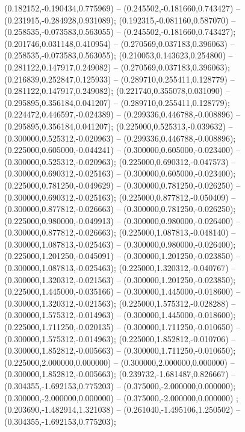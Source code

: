  (0.182152,-0.190434,0.775969) -- (0.245502,-0.181660,0.743427) -- (0.231915,-0.284928,0.931089);
 (0.192315,-0.081160,0.587070) -- (0.258535,-0.073583,0.563055) -- (0.245502,-0.181660,0.743427);
 (0.201746,0.031148,0.410954) -- (0.270569,0.037183,0.396063) -- (0.258535,-0.073583,0.563055);
 (0.210053,0.143623,0.254800) -- (0.281122,0.147917,0.249082) -- (0.270569,0.037183,0.396063);
 (0.216839,0.252847,0.125933) -- (0.289710,0.255411,0.128779) -- (0.281122,0.147917,0.249082);
 (0.221740,0.355078,0.031090) -- (0.295895,0.356184,0.041207) -- (0.289710,0.255411,0.128779);
 (0.224472,0.446597,-0.024389) -- (0.299336,0.446788,-0.008896) -- (0.295895,0.356184,0.041207);
 (0.225000,0.525313,-0.039632) -- (0.300000,0.525312,-0.020963) -- (0.299336,0.446788,-0.008896);
 (0.225000,0.605000,-0.044241) -- (0.300000,0.605000,-0.023400) -- (0.300000,0.525312,-0.020963);
 (0.225000,0.690312,-0.047573) -- (0.300000,0.690312,-0.025163) -- (0.300000,0.605000,-0.023400);
 (0.225000,0.781250,-0.049629) -- (0.300000,0.781250,-0.026250) -- (0.300000,0.690312,-0.025163);
 (0.225000,0.877812,-0.050409) -- (0.300000,0.877812,-0.026663) -- (0.300000,0.781250,-0.026250);
 (0.225000,0.980000,-0.049913) -- (0.300000,0.980000,-0.026400) -- (0.300000,0.877812,-0.026663);
 (0.225000,1.087813,-0.048140) -- (0.300000,1.087813,-0.025463) -- (0.300000,0.980000,-0.026400);
 (0.225000,1.201250,-0.045091) -- (0.300000,1.201250,-0.023850) -- (0.300000,1.087813,-0.025463);
 (0.225000,1.320312,-0.040767) -- (0.300000,1.320312,-0.021563) -- (0.300000,1.201250,-0.023850);
 (0.225000,1.445000,-0.035166) -- (0.300000,1.445000,-0.018600) -- (0.300000,1.320312,-0.021563);
 (0.225000,1.575312,-0.028288) -- (0.300000,1.575312,-0.014963) -- (0.300000,1.445000,-0.018600);
 (0.225000,1.711250,-0.020135) -- (0.300000,1.711250,-0.010650) -- (0.300000,1.575312,-0.014963);
 (0.225000,1.852812,-0.010706) -- (0.300000,1.852812,-0.005663) -- (0.300000,1.711250,-0.010650);
 (0.225000,2.000000,0.000000) -- (0.300000,2.000000,0.000000) -- (0.300000,1.852812,-0.005663);
 (0.239732,-1.681487,0.826667) -- (0.304355,-1.692153,0.775203) -- (0.375000,-2.000000,0.000000);
 (0.300000,-2.000000,0.000000) -- (0.375000,-2.000000,0.000000) ;
 (0.203690,-1.482914,1.321038) -- (0.261040,-1.495106,1.250502) -- (0.304355,-1.692153,0.775203);
